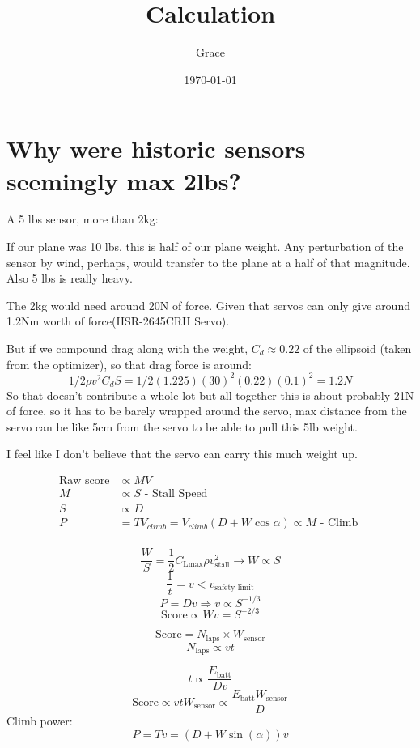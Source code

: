 \documentclass{article}
\title{Calculation}
\author{Grace}
\date{\today}
\begin{document}
\maketitle

\section{Why were historic sensors seemingly max 2lbs?}

A 5 lbs sensor, more than 2kg:

If our plane was 10 lbs, this is half of our plane weight. Any perturbation of the sensor by wind, perhaps, would transfer to the plane at a half of that magnitude. Also 5 lbs is really heavy.

The 2kg would need around 20N of force. Given that servos can only give around 1.2Nm worth of force(HSR-2645CRH Servo).

But if we compound drag along with the weight, $C_d \approx 0.22$ of the ellipsoid (taken from the optimizer), so that drag force is around:
\[
	1/2 \rho v^2 C_d S = 1/2 (1.225) (30)^2 (0.22) (0.1)^2 = 1.2N
\] 
So that doesn't contribute a whole lot but all together this is about probably 21N of force. so it has to be barely wrapped around the servo, max distance from the servo can be like 5cm from the servo to be able to pull this 5lb weight.

I feel like I don't believe that the servo can carry this much weight up.


\begin{align}
	\text{Raw score} &\propto M V\\
	M &\propto S \text{ - Stall Speed}\\ 
	S &\propto D \\
	P &= T V_{climb} = V_{climb}(D + W \cos\alpha ) \propto M  \text{ - Climb  } \\
\end{align}

\[
	\frac{W}{S} = \frac{1}{2}C_{\text{Lmax}}\rho v_{\text{stall}}^2 \rightarrow  W \propto S
\]
\[
	\frac{1}{t} = v < v_{\text{safety limit}}
\]
\[
	P = D v \Rightarrow v \propto S ^{-1/3}
\]
\[
	\text{Score} \propto W v = S^{-2/3}
\]

\[
	\text{Score} = N_\text{laps} \times W_\text{sensor}
\]
\[
	N_\text{laps}\propto v t
\]

\[
	 t \propto \frac{E_{\text{batt}}}{Dv}
\]
\[
	 \text{Score} \propto v t W_\text{sensor} \propto \frac{E_{\text{batt}} W_\text{sensor} }{D} 
\]
Climb power:
\[
	P = Tv = (D + W\sin(\alpha)) v 
\]
\end{document}
